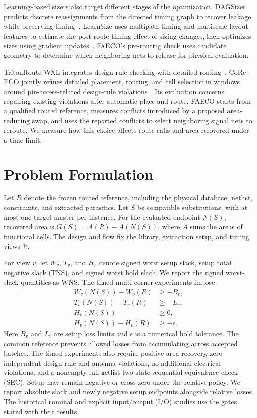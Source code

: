\documentclass[journal]{IEEEtran}
\begin{document}
Learning-based sizers also target different stages of the optimization. DAGSizer predicts discrete reassignments from the directed timing graph to recover leakage while preserving timing~\cite{dagsizer}. LearnSize uses multipath timing and multiscale layout features to estimate the post-route timing effect of sizing changes, then optimizes sizes using gradient updates~\cite{learnsize}. FAECO's pre-routing check uses candidate geometry to determine which neighboring nets to release for physical evaluation.

TritonRoute-WXL integrates design-rule checking with detailed routing~\cite{tritonroutewxl}. CoRe-ECO jointly refines detailed placement, routing, and cell selection in windows around pin-access-related design-rule violations~\cite{coreeco}. Its evaluation concerns repairing existing violations after automatic place and route. FAECO starts from a qualified routed reference, measures conflicts introduced by a proposed area-reducing swap, and uses the reported conflicts to select neighboring signal nets to reroute. We measure how this choice affects route calls and area recovered under a time limit.

\section{Problem Formulation}

Let \(R\) denote the frozen routed reference, including the physical database, netlist, constraints, and extracted parasitics. Let \(S\) be compatible substitutions, with at most one target master per instance. For the evaluated endpoint \(N(S)\), recovered area is \(G(S)=A(R)-A(N(S))\), where \(A\) sums the areas of functional cells. The design and flow fix the library, extraction setup, and timing views \(\mathcal{V}\).

For view \(v\), let \(W_v\), \(T_v\), and \(H_v\) denote signed worst setup slack, setup total negative slack (TNS), and signed worst hold slack. We report the signed worst-slack quantities as WNS. The timed multi-corner experiments impose
\begin{align}
W_v(N(S))-W_v(R)&\geq -B_v, \label{eq:setup}\\
T_v(N(S))-T_v(R)&\geq -L_v, \label{eq:tns}\\
H_v(N(S))&\geq 0, \label{eq:absolutehold}\\
H_v(N(S))-H_v(R)&\geq -\epsilon . \label{eq:hold}
\end{align}
Here \(B_v\) and \(L_v\) are setup loss limits and \(\epsilon\) is a numerical hold tolerance. The common reference prevents allowed losses from accumulating across accepted batches. The timed experiments also require positive area recovery, zero independent design-rule and antenna violations, no additional electrical violations, and a nonempty full-netlist two-state sequential equivalence check (SEC). Setup may remain negative or cross zero under the relative policy. We report absolute slack and newly negative setup endpoints alongside relative losses. The historical nominal and explicit input/output (I/O) studies use the gates stated with their results.
\end{document}
